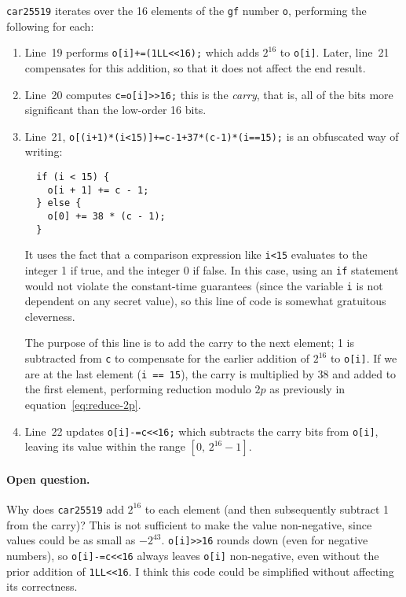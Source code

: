 \documentclass{article}
\begin{document}

\verb|car25519| iterates over the 16 elements of the \verb|gf| number \verb|o|, performing the following for each:
\begin{enumerate}
\item Line~19 performs \verb|o[i]+=(1LL<<16);| which adds $2^{16}$ to \verb|o[i]|.
    Later, line~21 compensates for this addition, so that it does not affect the end result.

\item Line~20 computes \verb|c=o[i]>>16;| this is the \emph{carry}, that is, all of the bits more significant than the low-order 16 bits.

\item Line~21, \verb|o[(i+1)*(i<15)]+=c-1+37*(c-1)*(i==15);| is an obfuscated way of writing:
\begin{verbatim}
  if (i < 15) {
    o[i + 1] += c - 1;
  } else {
    o[0] += 38 * (c - 1);
  }
\end{verbatim}
It uses the fact that a comparison expression like \verb|i<15| evaluates to the integer 1 if true, and the integer 0 if false.
In this case, using an \verb|if| statement would not violate the constant-time guarantees (since the variable \verb|i| is not dependent on any secret value), so this line of code is somewhat gratuitous cleverness.

    The purpose of this line is to add the carry to the next element; 1 is subtracted from \verb|c| to compensate for the earlier addition of $2^{16}$ to \verb|o[i]|.
    If we are at the last element (\verb|i == 15|), the carry is multiplied by 38 and added to the first element, performing reduction modulo $2p$ as previously in equation~\eqref{eq:reduce-2p}.

\item Line~22 updates \verb|o[i]-=c<<16;| which subtracts the carry bits from \verb|o[i]|, leaving its value within the range $[0,\, 2^{16}-1]$.
\end{enumerate}

\paragraph{Open question.}
Why does \verb|car25519| add $2^{16}$ to each element (and then subsequently subtract 1 from the carry)?
This is not sufficient to make the value non-negative, since values could be as small as $-2^{43}$.
\verb|o[i]>>16| rounds down (even for negative numbers), so \verb|o[i]-=c<<16| always leaves \verb|o[i]| non-negative, even without the prior addition of \verb|1LL<<16|.
I think this code could be simplified without affecting its correctness.
\end{document}
